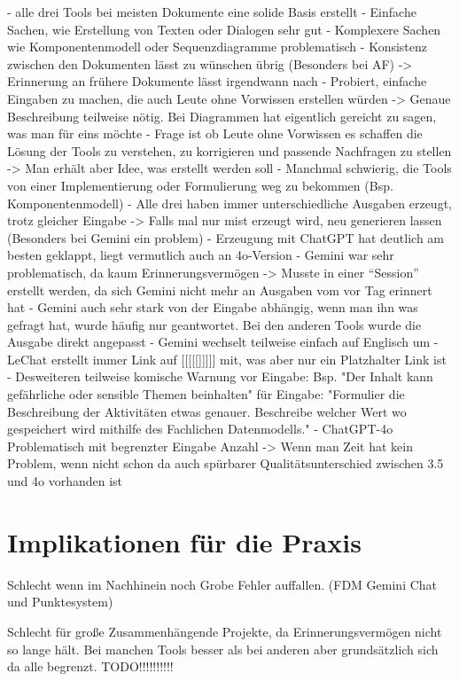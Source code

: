 - alle drei Tools bei meisten Dokumente eine solide Basis erstellt
- Einfache Sachen, wie Erstellung von Texten oder Dialogen sehr gut
- Komplexere Sachen wie Komponentenmodell oder Sequenzdiagramme problematisch
- Konsistenz zwischen den Dokumenten lässt zu wünschen übrig (Besonders bei AF) -> Erinnerung an frühere 
Dokumente lässt irgendwann nach
- Probiert, einfache Eingaben zu machen, die auch Leute ohne Vorwissen erstellen würden
-> Genaue Beschreibung teilweise nötig. Bei Diagrammen hat eigentlich gereicht zu sagen, was man für eins 
möchte
- Frage ist ob Leute ohne Vorwissen es schaffen die Lösung der Tools zu verstehen, zu korrigieren und passende 
Nachfragen zu stellen
-> Man erhält aber Idee, was erstellt werden soll
- Manchmal schwierig, die Tools von einer Implementierung oder Formulierung weg zu bekommen (Bsp. Komponentenmodell)
- Alle drei haben immer unterschiedliche Ausgaben erzeugt, trotz gleicher Eingabe
-> Falls mal nur mist erzeugt wird, neu generieren lassen (Besonders bei Gemini ein problem)
- Erzeugung mit ChatGPT hat deutlich am besten geklappt, liegt vermutlich auch an 4o-Version
- Gemini war sehr problematisch, da kaum Erinnerungsvermögen
-> Musste in einer ``Session'' erstellt werden, da sich Gemini nicht mehr an Ausgaben vom vor Tag erinnert hat
- Gemini auch sehr stark von der Eingabe abhängig, wenn man ihn was gefragt hat, wurde häufig nur geantwortet. Bei den 
anderen Tools wurde die Ausgabe direkt angepasst
- Gemini wechselt teilweise einfach auf Englisch um
- LeChat erstellt immer Link auf [[[[[]]]]] mit, was aber nur ein Platzhalter Link ist
- Desweiteren teilweise komische Warnung vor Eingabe: Bsp. "Der Inhalt kann gefährliche oder sensible Themen beinhalten" für Eingabe:
"Formulier die Beschreibung der Aktivitäten etwas genauer. Beschreibe welcher Wert wo gespeichert wird mithilfe des Fachlichen Datenmodells."
- ChatGPT-4o Problematisch mit begrenzter Eingabe Anzahl 
-> Wenn man Zeit hat kein Problem, wenn nicht schon da auch spürbarer Qualitätsunterschied zwischen 3.5 und 4o vorhanden ist


\section{Implikationen für die Praxis}  \label{Implikationen für die Praxis}

Schlecht wenn im Nachhinein noch Grobe Fehler auffallen. (FDM Gemini Chat und Punktesystem)

Schlecht für große Zusammenhängende Projekte, da Erinnerungsvermögen nicht so lange hält. Bei manchen Tools besser als bei anderen 
aber grundsätzlich sich da alle begrenzt.
TODO!!!!!!!!!!


